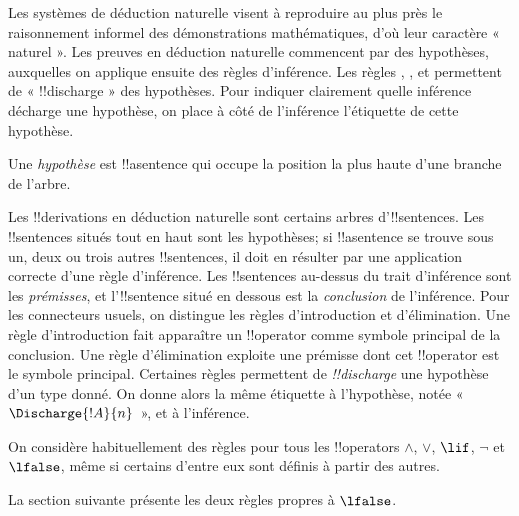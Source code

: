 \documentclass[../../../include/open-logic-section]{subfiles}
\begin{document}
      {}
      {}


\begin{explain}
Les systèmes de déduction naturelle visent à reproduire au plus près
le raisonnement informel des démonstrations mathématiques, d'où leur
caractère « naturel ». Les preuves en déduction naturelle commencent
par des hypothèses, auxquelles on applique ensuite des règles
d'inférence. Les règles \Intro{\lnot}, \Intro{\lif},
 et \FalseCl{}
permettent de « !!{discharge} » des hypothèses. Pour indiquer
clairement quelle inférence décharge une hypothèse, on place à côté
de l'inférence l'étiquette de cette hypothèse.
\end{explain}

\begin{defn}[Hypothèse]
Une \emph{hypothèse} est !!a{sentence} qui occupe la position
la plus haute d'une branche de l'arbre.
\end{defn}

Les !!{derivation}s en déduction naturelle sont certains arbres
d'!!{sentence}s. Les !!{sentence}s situés tout en haut sont les
hypothèses; si !!a{sentence} se trouve sous un, deux ou trois autres
!!{sentence}s, il doit en résulter par une application correcte d'une
règle d'inférence. Les !!{sentence}s au-dessus du trait d'inférence
sont les \emph{prémisses}, et l'!!{sentence} situé en dessous est la
\emph{conclusion} de l'inférence. Pour les connecteurs usuels,
on distingue les règles d'introduction et d'élimination. Une règle
d'introduction fait apparaître un !!{operator} comme symbole principal
de la conclusion. Une règle d'élimination exploite une prémisse dont
cet !!{operator} est le symbole principal. Certaines règles permettent
de \emph{!!{discharge}} une hypothèse d'un type donné. On donne alors
la même étiquette à l'hypothèse, notée «~$\Discharge{!A}{n}$~», et à l'inférence.


%
    {On considère habituellement des règles pour tous les !!{operator}s $\land$, $\lor$, $\lif$, $\lnot$ et $\lfalse$, même si certains d'entre eux sont définis à partir des autres.}

La section suivante présente les deux règles propres à $\lfalse$.
%
%
%
%
%
%
%
%
%
%
\end{document}
